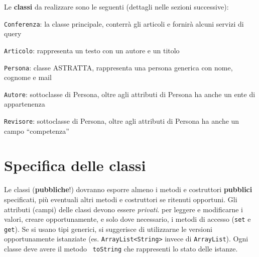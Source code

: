 \documentclass[a4paper]{article}
\begin{document}
Le \textbf{classi} da realizzare sono le seguenti (dettagli nelle sezioni 
successive):
\medskip

\begin{compactitem}

\item \texttt{Conferenza}: la classe principale, conterrà gli articoli e 
fornirà alcuni servizi di query

\item \texttt{Articolo}: rappresenta un testo con un autore e un titolo

\item \texttt{Persona}: classe ASTRATTA, rappresenta una persona  generica con 
nome, cognome e mail

\item \texttt{Autore}: sottoclasse di Persona, oltre agli attributi di Persona 
ha anche un ente di appartenenza

\item \texttt{Revisore}: sottoclasse di Persona, oltre agli attributi di 
Persona ha anche un campo ``competenza''

\end{compactitem}

\section*{Specifica delle classi}

Le classi (\textbf{pubbliche}!) dovranno esporre almeno i metodi e costruttori \textbf{pubblici} specificati, più eventuali altri metodi e costruttori %
se ritenuti opportuni.
Gli attributi (campi) delle classi devono essere \emph{privati}.
per leggere e modificarne i valori, 
creare opportunamente, e solo dove necessario, i metodi di accesso ({\tt set} e 
{\tt get}).
Se si usano tipi generici, si suggerisce  di utilizzarne le versioni
opportunamente istanziate (es. \texttt{ArrayList<String>} invece di
\texttt{ArrayList}).
Ogni classe deve avere il metodo {\tt 
toString} che rappresenti lo stato delle istanze. 

\end{document}
